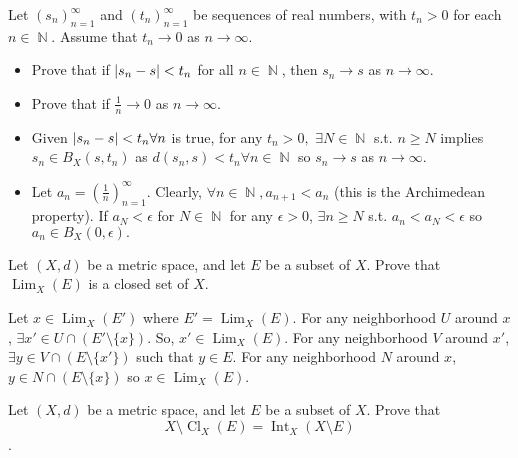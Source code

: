 \documentclass[12pt,letterpaper,boxed]{hmcpset}
\DeclareMathOperator{\Lim}{Lim}
\DeclareMathOperator{\Int}{Int}
\DeclareMathOperator{\Cl}{Cl}
\DeclareMathOperator{\N}{\mathbb{N}}
\DeclarePairedDelimiter\abs{\lvert}{\rvert}%
\begin{document}
\begin{problem}[Exercise 1.15]
Let $(s_n)_{n=1}^{\infty}$ and $(t_n)_{n=1}^{\infty}$ be sequences of real numbers, with $t_n > 0$ for each $n\in\N.$ Assume that $t_n \rightarrow 0$ as $n\rightarrow \infty.$
\vspace{-2mm}
\begin{itemize}
	\itemsep0em
	\item Prove that if $\abs{s_n - s} < t_n$ for all $n \in \N$, then $s_n \rightarrow s$ as $n \rightarrow \infty.$
	\item Prove that if $\frac{1}{n}\rightarrow 0$ as $n\rightarrow \infty.$
\end{itemize}
\end{problem}

\begin{solution}
\vspace{-2mm}
\begin{itemize}
	\itemsep0em
	\item Given $\abs{s_n - s} < t_n \forall n$ is true, for any $t_n > 0,$ $\exists N \in \N$ s.t. $n \ge N$ implies $s_n \in B_X(s, t_n)$ as $d(s_n , s) < t_n \forall n\in\N$ so $s_n\rightarrow s$ as $n \rightarrow \infty.$
	\item Let $a_n = (\frac{1}{n})_{n=1}^{\infty}$. Clearly, $\forall n\in \N, a_{n+1} < a_{n}$ (this is the Archimedean property). If $a_N < \epsilon$ for $N \in \N$ for any $\epsilon > 0$, $\exists n \ge N$ s.t. $a_n < a_N < \epsilon$ so $a_n \in B_X(0, \epsilon).$ 
\end{itemize}
\end{solution}

\begin{problem}[Exercise 1.21]
Let $(X,d)$ be a metric space, and let $E$ be a subset of $X$. Prove that $\Lim_X(E)$ is a closed set of $X$.
\end{problem}

\begin{solution}
Let $x \in \Lim_X(E')$ where $E' = \Lim_X(E).$ For any neighborhood $U$ around $x$, $\exists x' \in U \cap (E'\setminus \{x\})$. So, $x' \in \Lim_X(E).$  For any neighborhood $V$ around $x'$, $\exists y \in V \cap (E\setminus \{x'\})$ such that $y\in E.$ For any neighborhood $N$ around $x$, $y\in N\cap(E\setminus\{ x\})$ so $x \in \Lim_X(E)$.
\end{solution}

\begin{problem}[Exercise 1.24]
Let $(X,d)$ be a metric space, and let $E$ be a subset of $X$. Prove that $$X\setminus\Cl_X(E)=\Int_X(X\setminus E)$$. 
\end{problem}
\end{document}
